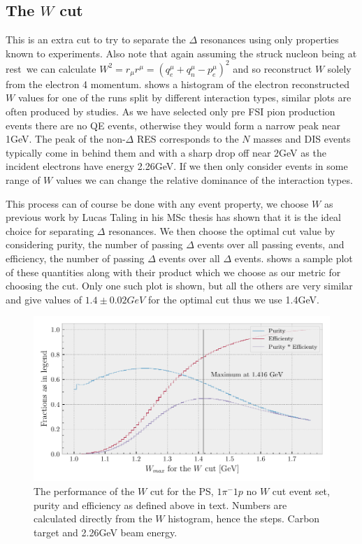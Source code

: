 \documentclass[a4paper,12pt]{article}
\begin{document}
\subsection{The $W$ cut}
This is an extra cut to try to separate the $\Delta$ resonances using only properties known to experiments.
Also note that again assuming the struck nucleon being at rest\footnotemark\ we can calculate $W^2 = r_\mu r^\mu = (q_e^\mu + q_n^\mu - p_e^\mu)^2$ and so reconstruct $W$ solely from the electron 4 momentum.
 shows a histogram of the electron reconstructed $W$ values for one of the runs split by different interaction types, similar plots are often produced by studies.
As we have selected only pre FSI pion production events there are no QE events, otherwise they would form a narrow peak near 1\si{GeV}.
The peak of the non-$\Delta$ RES corresponds to the $N$ masses and DIS events typically come in behind them and with a sharp drop off near 2\si{GeV} as the incident electrons have energy 2.26\si{GeV}.
If we then only consider events in some range of $W$ values we can change the relative dominance of the interaction types.

This process can of course be done with any event property, we choose $W$ as previous work by Lucas Taling in his MSc thesis\cite{lucassThesis} has shown that it is the ideal choice for separating $\Delta$ resonances.
We then choose the optimal cut value by considering purity, the number of passing $\Delta$ events over all passing events, and efficiency, the number of passing $\Delta$ events over all $\Delta$ events.
 shows a sample plot of these quantities along with their product which we choose as our metric for choosing the cut.
Only one such plot is shown, but all the others are very similar and give values of $1.4 \pm 0.02 \si{GeV}$ for the optimal cut thus we use 1.4\si{GeV}.

\begin{figure}[H]
    \centering
    \includegraphics{figures/python/W_cut_metr.pdf}
    \caption{
        The performance of the $W$ cut for the PS, $1\pi^-1p$ no $W$ cut event set, purity and efficiency as defined above in text.
        Numbers are calculated directly from the $W$ histogram, hence the steps.
        Carbon target and 2.26\si{GeV} beam energy.
    }\label{fig:W_cut_metr}
\end{figure}
\end{document}
